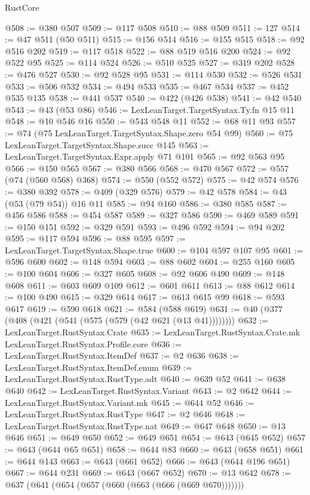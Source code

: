 \begin{lexlean}{RustCore}
\begin{coremodule}
@508 := @380 @507
@509 := @117 @508
@510 := @88 @509
@511 := 127
@514 := @47 @511 (@50 @511)
@515 := @156 @514
@516 := @155 @515
@518 := @92 @516 @202
@519 := @117 @518
@522 := @88 @519 @516 @200
@524 := @92 @522 @95
@525 := @114 @524
@526 := @510 @525
@527 := @319 @202
@528 := @476 @527
@530 := @92 @528 @95
@531 := @114 @530
@532 := @526 @531
@533 := @506 @532
@534 := @494 @533
@535 := @467 @534
@537 := @452 @535 @135
@538 := @441 @537
@540 := @422 (@426 @538)
@541 := @42 @540
@543 := @43 (@53 @86)
@546 := LexLeanTarget.TargetSyntax.Ty.fn @15 @11
@548 := @10 @546 @16
@550 := @543 @548 @11
@552 := @68 @11 @93
@557 := @74 (@75 LexLeanTarget.TargetSyntax.Shape.zero @54 @99)
@560 := @75 LexLeanTarget.TargetSyntax.Shape.succ @145
@563 := LexLeanTarget.TargetSyntax.Expr.apply @71 @101
@565 := @92 @563 @95
@566 := @150 @565
@567 := @380 @566
@568 := @470 @567
@572 := @557 (@74 (@560 @568) @368)
@574 := @550 (@552 @572)
@575 := @42 @574
@576 := @380 @392
@578 := @409 (@329 @576)
@579 := @42 @578
@584 := @43 (@53 (@79 @54)) @16 @11
@585 := @94 @160
@586 := @380 @585
@587 := @456 @586
@588 := @454 @587
@589 := @327 @586
@590 := @469 @589
@591 := @150 @151
@592 := @329 @591
@593 := @496 @592
@594 := @94 @202
@595 := @117 @594
@596 := @88 @595
@597 := LexLeanTarget.TargetSyntax.Shape.true
@600 := @104 @597 @107 @95
@601 := @596 @600
@602 := @148 @594
@603 := @88 @602
@604 := @255 @160
@605 := @100 @604
@606 := @327 @605
@608 := @92 @606 @490
@609 := @148 @608
@611 := @603 @609 @109
@612 := @601 @611
@613 := @88 @612
@614 := @100 @490
@615 := @329 @614
@617 := @613 @615 @99
@618 := @593 @617
@619 := @590 @618
@621 := @584 (@588 @619)
@631 := @40 (@377 (@408 (@421 (@541 (@575 (@579 (@42 @621 (@13 @41))))))))
@632 := LexLeanTarget.RustSyntax.Crate
@635 := LexLeanTarget.RustSyntax.Crate.mk LexLeanTarget.RustSyntax.Profile.core
@636 := LexLeanTarget.RustSyntax.ItemDef
@637 := @2 @636
@638 := LexLeanTarget.RustSyntax.ItemDef.enum
@639 := LexLeanTarget.RustSyntax.RustType.adt
@640 := @639 @52
@641 := @638 @640
@642 := LexLeanTarget.RustSyntax.Variant
@643 := @2 @642
@644 := LexLeanTarget.RustSyntax.Variant.mk
@645 := @644 @52
@646 := LexLeanTarget.RustSyntax.RustType
@647 := @2 @646
@648 := LexLeanTarget.RustSyntax.RustType.nat
@649 := @647 @648
@650 := @13 @646
@651 := @649 @650
@652 := @649 @651
@654 := @643 (@645 @652)
@657 := @643 (@644 @65 @651)
@658 := @644 @83
@660 := @643 (@658 @651)
@661 := @644 @143
@663 := @643 (@661 @652)
@666 := @643 (@644 @196 @651)
@667 := @644 @231
@669 := @643 (@667 @652)
@670 := @13 @642
@678 := @637 (@641 (@654 (@657 (@660 (@663 (@666 (@669 @670)))))))

\end{coremodule}
\end{lexlean}
